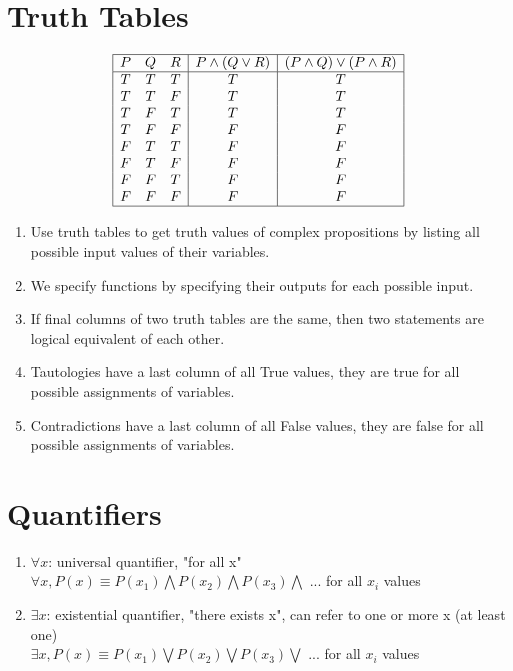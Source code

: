 \documentclass[11pt]{article}
\begin{document}
\section*{Truth Tables}
\begin{displaymath}
\begin{array}{|ccc|c|c|}
\hline
P & Q & R & P \wedge (Q \vee R) & (P \wedge Q) \vee (P \wedge R)\\ %
\hline %
T & T & T & T & T\\
T & T & F & T & T\\
T & F & T & T & T\\
T & F & F & F & F \\
F & T & T & F & F \\
F & T & F & F  & F\\
F & F & T & F &  F\\
F & F & F & F & F\\
\hline
\end{array}
\end{displaymath}
\begin{enumerate}
\item Use truth tables to get truth values of complex propositions by listing all possible input values of their variables.
\item We specify functions by specifying their outputs for each possible input.
\item If final columns of two truth tables are the same, then two statements are logical equivalent of each other.
\item Tautologies have a last column of all True values, they are true for all possible assignments of variables.
\item  Contradictions have a last column of all False values, they are false for all possible assignments of variables.
\end{enumerate}


\section*{Quantifiers}
\begin{enumerate}
\item 
$\forall x$: universal quantifier, "for all x" \\
$\forall x, P(x) \equiv P({x_1}) \bigwedge P({x_2}) \bigwedge P({x_3}) \bigwedge $ ... for all ${x_i}$ values
\item
$\exists x$: existential quantifier, "there exists x", can refer to one or more x (at least one)\\
$\exists x, P(x) \equiv P({x_1}) \bigvee P({x_2}) \bigvee P({x_3}) \bigvee $ ... for all ${x_i}$ values
\end{enumerate}
\end{document}
